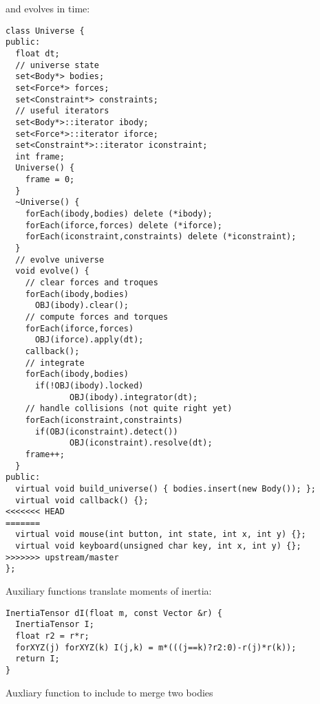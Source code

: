 and evolves in time: \begin{lstlisting}
class Universe {
public:
  float dt;
  // universe state
  set<Body*> bodies;
  set<Force*> forces;
  set<Constraint*> constraints;
  // useful iterators
  set<Body*>::iterator ibody;
  set<Force*>::iterator iforce;
  set<Constraint*>::iterator iconstraint;
  int frame;
  Universe() {
    frame = 0;
  }
  ~Universe() {
    forEach(ibody,bodies) delete (*ibody);
    forEach(iforce,forces) delete (*iforce);
    forEach(iconstraint,constraints) delete (*iconstraint);
  }
  // evolve universe
  void evolve() {
    // clear forces and troques
    forEach(ibody,bodies)
      OBJ(ibody).clear();
    // compute forces and torques
    forEach(iforce,forces)
      OBJ(iforce).apply(dt);
    callback();
    // integrate
    forEach(ibody,bodies)
      if(!OBJ(ibody).locked)
             OBJ(ibody).integrator(dt);
    // handle collisions (not quite right yet)
    forEach(iconstraint,constraints)
      if(OBJ(iconstraint).detect())
             OBJ(iconstraint).resolve(dt);
    frame++;
  }
public:
  virtual void build_universe() { bodies.insert(new Body()); };
  virtual void callback() {};
<<<<<<< HEAD
=======
  virtual void mouse(int button, int state, int x, int y) {};
  virtual void keyboard(unsigned char key, int x, int y) {};
>>>>>>> upstream/master
};
\end{lstlisting}
\noindent
Auxiliary functions translate moments of inertia: \begin{lstlisting}
InertiaTensor dI(float m, const Vector &r) {
  InertiaTensor I;
  float r2 = r*r;
  forXYZ(j) forXYZ(k) I(j,k) = m*(((j==k)?r2:0)-r(j)*r(k));
  return I;
}
\end{lstlisting}
\noindent
Auxliary function to include to merge two bodies
